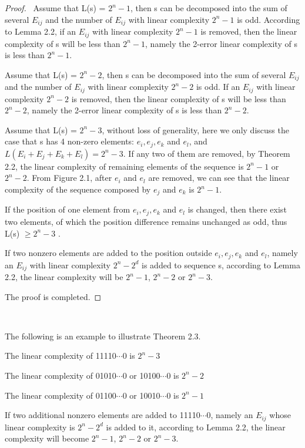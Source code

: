 \documentclass[10pt,conference,twocolumn]{IEEEtran}
\begin{document}
\begin{proof}\ Assume that L(s) = $2^n-1$, then s can be decomposed into the sum of several $E_{ij}$ and
the number of $E_{ij}$ with linear complexity $2^n-1$ is odd.
According to Lemma 2.2, if an $E_{ij}$ with linear complexity
$2^n-1$ is removed, then the linear complexity of s will be less
than $2^n-1$, namely the 2-error linear complexity of s is less than
$2^n-1$.

Assume that L(s) = $2^n-2$, then s can be decomposed into the sum of
several $E_{ij}$ and the number of $E_{ij}$ with linear complexity
$2^n-2$ is odd. If an $E_{ij}$ with linear complexity $2^n-2$ is
removed, then the linear complexity of s will be less than $2^n-2$,
namely the 2-error linear complexity of s is less than $2^n-2$.

Assume that L(s) = $2^n-3$, without loss of generality, here we only
discuss the case that s has 4 non-zero elements: $e_i, e_j, e_k$ and
$e_l$, and $L(E_i+E_j +E_k+E_l)= 2^n-3$. If any two of them are
removed, by Theorem 2.2, the linear complexity of remaining elements
of the sequence is $2^n-1$ or $2^n-2$. From Figure 2.1, after $e_i$
and $e_l$ are removed, we can see that the linear complexity of the
sequence composed by $e_j$ and $e_k$ is $2^n-1$.

If the position of one element from $e_i, e_j, e_k$ and $e_l$ is
changed, then there exist two elements, of which the position
difference remains unchanged as odd, thus L(s) $\ge 2^n-3$ .

If two nonzero elements are added to the position outside $e_i, e_j,
e_k$ and $e_l$, namely an $E_{ij}$ with linear complexity $2^n-2^d$
is added to sequence s, according to Lemma 2.2, the linear
complexity will be $2^n-1$, $2^n-2$ or $2^n-3$.

The proof is completed.
\end{proof}\

The following is an example to illustrate Theorem 2.3.

 The linear
complexity of 11110$\cdots$0 is $2^n-3$

The linear complexity of 01010$\cdots$0 or 10100$\cdots$0 is $2^n-2$

The linear complexity of 01100$\cdots$0 or 10010$\cdots$0 is $2^n-1$

If two additional nonzero elements are added to 11110$\cdots$0,
namely an $E_{ij}$ whose linear complexity is $2^n-2^d$ is added to
it, according to Lemma 2.2, the linear complexity will become
$2^n-1$, $2^n-2$ or $2^n-3$.
\end{document}
